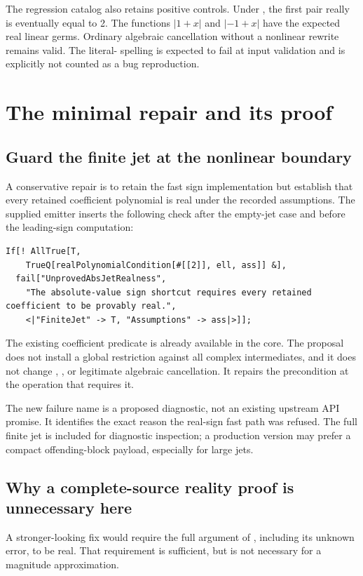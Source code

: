 \documentclass[11pt]{article}
\newcommand{\code}[1]{\texttt{\detokenize{#1}}}
\theoremstyle{remark}\newtheorem{remark}[theorem]{Remark}
\begin{document}
The regression catalog also retains positive controls. Under
\code{Element[a, Reals]}, the first pair really is eventually equal to 2.
The functions \(|1+x|\) and \(|-1+x|\) have the expected real linear germs.
Ordinary algebraic cancellation without a nonlinear rewrite remains valid.
The literal-\code{I} spelling is expected to fail at input validation and is
explicitly not counted as a bug reproduction.

\section{The minimal repair and its proof}
\subsection{Guard the finite jet at the nonlinear boundary}
A conservative repair is to retain the fast sign implementation but establish
that every retained coefficient polynomial is real under the recorded
assumptions. The supplied emitter inserts the following check after the
empty-jet case and before the leading-sign computation:
\begin{lstlisting}
If[! AllTrue[T,
    TrueQ[realPolynomialCondition[#[[2]], ell, ass]] &],
  fail["UnprovedAbsJetRealness",
    "The absolute-value sign shortcut requires every retained coefficient to be provably real.",
    <|"FiniteJet" -> T, "Assumptions" -> ass|>]];
\end{lstlisting}
The existing coefficient predicate is already available in the core. The
proposal does not install a global restriction against all complex
intermediates, and it does not change \code{pConst}, \code{pAdd}, or legitimate
algebraic cancellation. It repairs the precondition at the operation that
requires it.\cite{core}

The new failure name is a proposed diagnostic, not an existing upstream API
promise. It identifies the exact reason the real-sign fast path was refused.
The full finite jet is included for diagnostic inspection; a production version
may prefer a compact offending-block payload, especially for large jets.

\subsection{Why a complete-source reality proof is unnecessary here}
A stronger-looking fix would require the full argument of \code{Abs}, including
its unknown error, to be real. That requirement is sufficient, but is not
necessary for a magnitude approximation.
\end{document}
